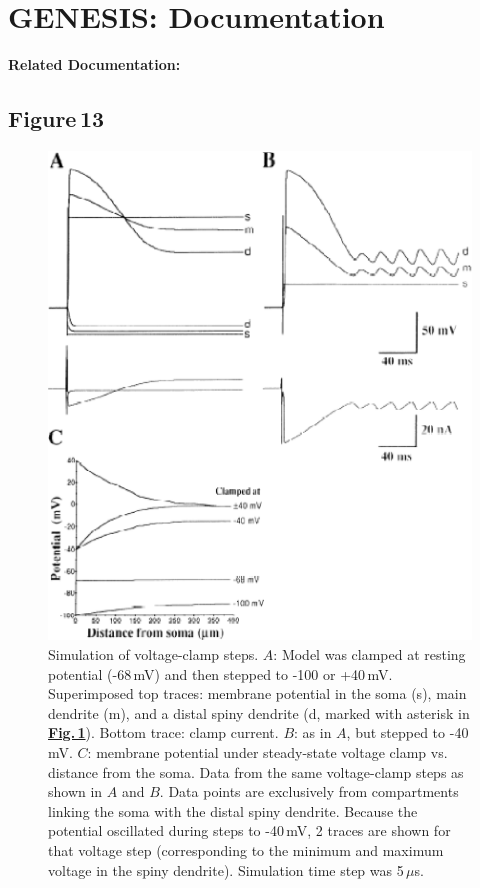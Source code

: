 \documentclass[12pt]{article}
\begin{document}
\section*{GENESIS: Documentation}

{\bf Related Documentation:}

\subsection*{Figure\,13}

\begin{figure}[h]
\centering
   \includegraphics[scale=0.75]{figures/Fig.1.13.eps}
   \caption{Simulation of voltage-clamp steps. $A$: Model was clamped at resting potential (-68\,mV) and then stepped to -100 or +40\,mV. Superimposed top traces: membrane potential in the soma (s), main dendrite (m), and a distal spiny dendrite (d, marked with asterisk in \href{../pub-purkinje-deschutter1-fig-1/pub-purkinje-deschutter1-fig-1.tex}{\bf Fig.\,1}). Bottom trace: clamp current. $B$: as in $A$, but stepped to -40\,mV. $C$: membrane potential under steady-state voltage clamp vs. distance from the soma. Data from the same voltage-clamp steps as shown in $A$ and $B$. Data points are exclusively from compartments linking the soma with the distal spiny dendrite. Because the potential oscillated during steps to -40\,mV, 2 traces are shown for that voltage step (corresponding to the minimum and maximum voltage in the spiny dendrite). Simulation time step was 5\,$\mu$s.}
   \label{fig:DS1.13}
\end{figure}



\end{document}

